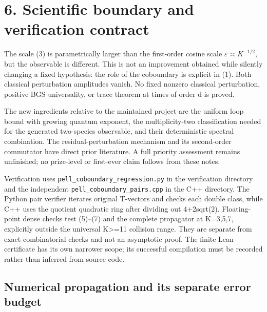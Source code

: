 \documentclass[11pt,a4paper]{article}
\begin{document}
\hypertarget{scientific-boundary-and-verification-contract}{%
\section{6. Scientific boundary and verification contract}\label{scientific-boundary-and-verification-contract}}

The scale (3) is parametrically larger than the first-order cosine scale \(\varepsilon\asymp K^{-1/2}\), but the observable is different. This is not an improvement obtained while silently changing a fixed hypothesis: the role of the coboundary is explicit in (1). Both classical perturbation amplitudes vanish. No fixed nonzero classical perturbation, positive BGS universality, or trace theorem at times of order d is proved.

The new ingredients relative to the maintained project are the uniform loop bound with growing quantum exponent, the multiplicity-two classification needed for the generated two-species observable, and their deterministic spectral combination. The residual-perturbation mechanism and its second-order commutator have direct prior literature. A full priority assessment remains unfinished; no prize-level or first-ever claim follows from these notes.

Verification uses \texttt{pell\_coboundary\_regression.py} in the verification directory and the independent \texttt{pell\_coboundary\_pairs.cpp} in the C++ directory. The Python pair verifier iterates original T-vectors and checks each double class, while C++ uses the quotient quadratic ring after dividing out 4+2sqrt(2). Floating-point dense checks test (5)--(7) and the complete propagator at K=3,5,7, explicitly outside the universal K\textgreater=11 collision range. They are separate from exact combinatorial checks and not an asymptotic proof. The finite Lean certificate has its own narrower scope; its successful compilation must be recorded rather than inferred from source code.

\hypertarget{numerical-propagation-and-its-separate-error-budget}{%
\subsection{Numerical propagation and its separate error budget}\label{numerical-propagation-and-its-separate-error-budget}}
\end{document}

